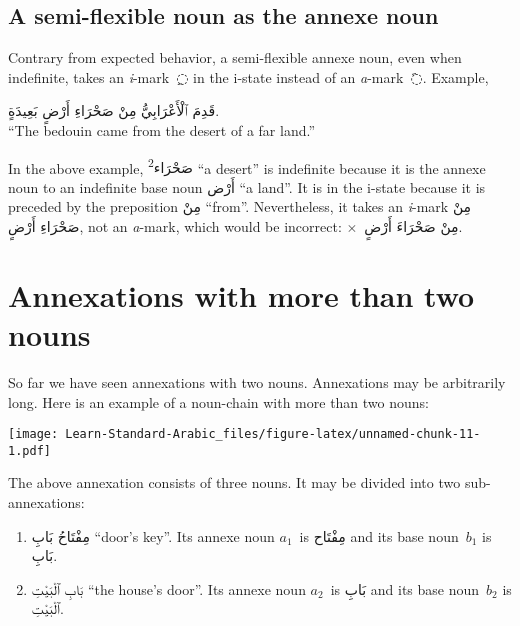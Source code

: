 \documentclass[
  10pt,
]{book}
\providecommand{\tightlist}{%
  \setlength{\itemsep}{0pt}\setlength{\parskip}{0pt}}
\begin{document}
\subsection{A semi-flexible noun as the annexe noun}\label{a-semi-flexible-noun-as-the-annexe-noun}

Contrary from expected behavior, a semi-flexible annexe noun, even when indefinite, takes an \emph{i}-mark~\foreignlanguage{arabic}{◌ِ} in the i-state instead of an \emph{a}-mark~\foreignlanguage{arabic}{◌َ}. Example,

\foreignlanguage{arabic}{قَدِمَ ٱلْأَعْرَابِيُّ مِنْ صَحْرَاءِ أَرْضٍ بَعِيدَةٍ.}\\
\enquote{The bedouin came from the desert of a far land.}

In the above example,
\foreignlanguage{arabic}{صَحْرَاء\textsuperscript{2}} \enquote{a desert} is indefinite because it is the annexe noun to an indefinite base noun \foreignlanguage{arabic}{أَرْض} \enquote{a land}.
It is in the i-state because it is preceded by the preposition \foreignlanguage{arabic}{مِنْ} \enquote{from}.
Nevertheless, it takes an \emph{i}-mark \foreignlanguage{arabic}{مِنْ صَحْرَاءِ أَرْضٍ}, not an \emph{a}-mark, which would be incorrect: \(\times\)~\foreignlanguage{arabic}{مِنْ صَحْرَاءَ أَرْضٍ}.

\section{Annexations with more than two nouns}\label{annexations-with-more-than-two-nouns}

So far we have seen annexations with two nouns. Annexations may be arbitrarily long. Here is an example of a noun-chain with more than two nouns:

\texttt{[image: Learn-Standard-Arabic\_files/figure-latex/unnamed-chunk-11-1.pdf]}

The above annexation consists of three nouns. It may be divided into two sub-annexations:

\begin{enumerate}
\def\labelenumi{\roman{enumi}.}
\tightlist
\item
  \foreignlanguage{arabic}{مِفْتَاحُ بَابِ} \enquote{door's key}. Its annexe noun \(a_1\)~is \foreignlanguage{arabic}{مِفْتَاح} and its base noun~\(b_1\) is \foreignlanguage{arabic}{بَابِ}.
\item
  \foreignlanguage{arabic}{بَابِ ٱلْبَيْتِ} \enquote{the house's door}. Its annexe noun \(a_2\)~is \foreignlanguage{arabic}{بَابِ} and its base noun~\(b_2\) is \foreignlanguage{arabic}{ٱلْبَيْتِ}.
\end{enumerate}
\end{document}
